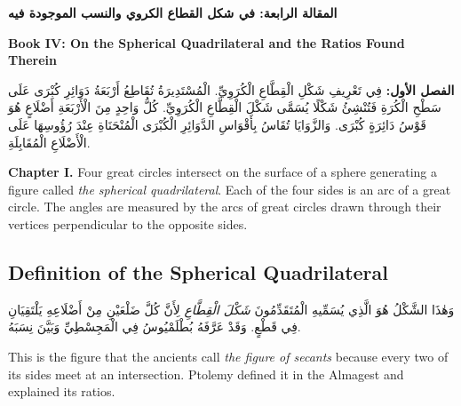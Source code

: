 \documentclass[11pt,a4paper]{article}
\theoremstyle{plain}
\theoremstyle{definition}
\theoremstyle{remark}
\newcommand{\ar}[1]{{\arabicfont\beginR #1\endR}}
\newcommand{\bilingualpair}[2]{%
  \par\noindent
  \begin{minipage}[t]{0.48\textwidth}
  #1
  \end{minipage}%
  \hfill
  \begin{minipage}[t]{0.48\textwidth}
  \vspace*{0pt}#2
  \end{minipage}\par\vspace{0.3cm}%
}
\begin{document}
\bilingualpair{\noindent\textcolor{arabicblue}{\textbf{\ar{المقالة الرابعة: في شكل القطاع الكروي والنسب الموجودة فيه}}}}{\noindent\textcolor{sectioncolor}{\textbf{Book IV: On the Spherical Quadrilateral and the Ratios Found Therein}}}

\vspace{0.3cm}

\bilingualpair{\ar{\textbf{الفصل الأول:} فِي تَعْرِيفِ شَكْلِ الْقِطَّاعِ الْكُرَوِيِّ. الْمُسْتَدِيرَةُ تُقَاطِعُ أَرْبَعَةُ دَوَائِرِ كُبْرَى عَلَى سَطْحِ الْكُرَةِ فَتُنْشِئُ شَكْلًا يُسَمَّى شَكْلَ الْقِطَّاعِ الْكُرَوِيِّ. كُلُّ وَاحِدٍ مِنَ الْأَرْبَعَةِ أَضْلَاعٍ هُوَ قَوْسُ دَائِرَةٍ كُبْرَى. وَالزَّوَايَا تُقَاسُ بِأَقْوَاسِ الدَّوَائِرِ الْكُبْرَى الْمُنْحَنَاةِ عِنْدَ رُؤُوسِهَا عَلَى الْأَضْلَاعِ الْمُقَابِلَةِ.}}{\noindent\textbf{Chapter I.} Four great circles intersect on the surface of a sphere generating a figure called \textit{the spherical quadrilateral}. Each of the four sides is an arc of a great circle. The angles are measured by the arcs of great circles drawn through their vertices perpendicular to the opposite sides.}

\vspace{0.5cm}

\subsection{Definition of the Spherical Quadrilateral}
\label{sec:def-sph-quad}

\begin{center}
\end{center}

\vspace{0.5cm}

\bilingualpair{\ar{وَهٰذَا الشَّكْلُ هُوَ الَّذِي يُسَمِّيهِ الْمُتَقَدِّمُونَ \textit{شَكْلَ الْقِطَّاعِ} لِأَنَّ كُلَّ ضَلْعَيْنِ مِنْ أَضْلَاعِهِ يَلْتَقِيَانِ فِي قَطْعٍ. وَقَدْ عَرَّفَهُ بُطْلَمْيُوسُ فِي الْمَجِسْطِيِّ وَبَيَّنَ نِسَبَهُ.}}{This is the figure that the ancients call \textit{the figure of secants} because every two of its sides meet at an intersection. Ptolemy defined it in the Almagest and explained its ratios.}
\end{document}
